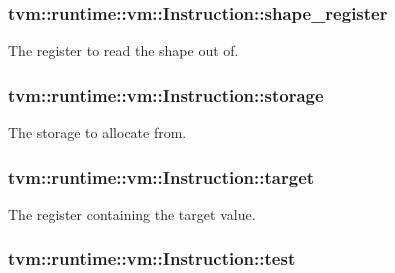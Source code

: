 \subsubsection[{\texorpdfstring{shape\+\_\+register}{shape_register}}]{ tvm\+::runtime\+::vm\+::\+Instruction\+::shape\+\_\+register}\hypertarget{structtvm_1_1runtime_1_1vm_1_1Instruction_a0a650382fcb2cacf9d6de7007aecf3c5}{}\label{structtvm_1_1runtime_1_1vm_1_1Instruction_a0a650382fcb2cacf9d6de7007aecf3c5}


The register to read the shape out of. 

\subsubsection[{\texorpdfstring{storage}{storage}}]{ tvm\+::runtime\+::vm\+::\+Instruction\+::storage}\hypertarget{structtvm_1_1runtime_1_1vm_1_1Instruction_a3412cabd3b4f42f106f56fc22257f6ca}{}\label{structtvm_1_1runtime_1_1vm_1_1Instruction_a3412cabd3b4f42f106f56fc22257f6ca}


The storage to allocate from. 

\subsubsection[{\texorpdfstring{target}{target}}]{ tvm\+::runtime\+::vm\+::\+Instruction\+::target}\hypertarget{structtvm_1_1runtime_1_1vm_1_1Instruction_a46879dbe84105fb621a6167f8d73b223}{}\label{structtvm_1_1runtime_1_1vm_1_1Instruction_a46879dbe84105fb621a6167f8d73b223}


The register containing the target value. 

\subsubsection[{\texorpdfstring{test}{test}}]{ tvm\+::runtime\+::vm\+::\+Instruction\+::test}\hypertarget{structtvm_1_1runtime_1_1vm_1_1Instruction_adebc0e955069bdaa543df3a908351532}{}\label{structtvm_1_1runtime_1_1vm_1_1Instruction_adebc0e955069bdaa543df3a908351532}


